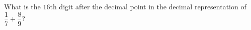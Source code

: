 What is the $16$th digit after the decimal point in the decimal representation of $\dfrac{1}{7}+\dfrac{8}{9}$?
